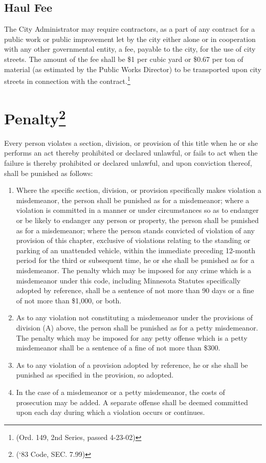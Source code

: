 \subsection{Haul Fee}
The City Administrator may require contractors, as a part of any contract for a public work or public improvement let by the city either alone or in cooperation with any other governmental entity, a fee, payable to the city, for the use of city streets.  The amount of the fee shall be \$1 per cubic yard or \$0.67 per ton of material (as estimated by the Public Works Director) to be transported upon city streets in connection with the contract.\footnote{(Ord. 149, 2nd Series, passed 4-23-02)}

\setcounter{section}{98}
\section{Penalty\footnote{(‘83 Code, SEC. 7.99)}}
Every person violates a section, division, or provision of this title when he or she performs an act thereby prohibited or declared unlawful, or fails to act when the failure is thereby prohibited or declared unlawful, and upon conviction thereof, shall be punished as follows:
\begin{enumerate}[{\indent}A)]
    \item Where the specific section, division, or provision specifically makes violation a misdemeanor, the person shall be punished as for a misdemeanor; where a violation is committed in a manner or under circumstances so as to endanger or be likely to endanger any person or property, the person shall be punished as for a misdemeanor; where the person stands convicted of violation of any provision of this chapter, exclusive of violations relating to the standing or parking of an unattended vehicle, within the immediate preceding 12-month period for the third or subsequent time, he or she shall be punished as for a misdemeanor.  The penalty which may be imposed for any crime which is a misdemeanor under this code, including Minnesota Statutes specifically adopted by reference, shall be a sentence of not more than 90 days or a fine of not more than \$1,000, or both.
    \item As to any violation not constituting a misdemeanor under the provisions of division (A) above,  the person shall be punished as for a petty misdemeanor.  The penalty which may be imposed for any petty offense which is a petty misdemeanor shall be a sentence of a fine of not more than \$300.
    \item As to any violation of a provision adopted by reference, he or she shall be punished as specified in the provision, so adopted.
    \item In the case of a misdemeanor or a petty misdemeanor, the costs of prosecution may be added.  A separate offense shall be deemed committed upon each day during which a violation occurs or continues.
\end{enumerate}
